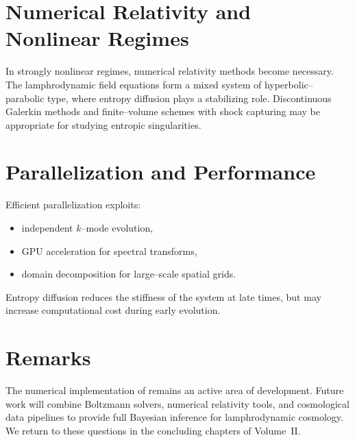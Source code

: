 \section{Numerical Relativity and Nonlinear Regimes}

In strongly nonlinear regimes, numerical relativity methods become
necessary.  The lamphrodynamic field equations form a mixed system of
hyperbolic--parabolic type, where entropy diffusion plays a stabilizing
role.  Discontinuous Galerkin methods and finite--volume schemes with
shock capturing may be appropriate for studying entropic singularities.

\section{Parallelization and Performance}

Efficient parallelization exploits:
\begin{itemize}
  \item independent $k$--mode evolution,
  \item GPU acceleration for spectral transforms,
  \item domain decomposition for large--scale spatial grids.
\end{itemize}
Entropy diffusion reduces the stiffness of the system at late times,
but may increase computational cost during early evolution.

\section{Remarks}

The numerical implementation of \rsvpabbr{} remains an active area of
development.  Future work will combine Boltzmann solvers, numerical
relativity tools, and cosmological data pipelines to provide full
Bayesian inference for lamphrodynamic cosmology.  We return to these
questions in the concluding chapters of Volume~II.

